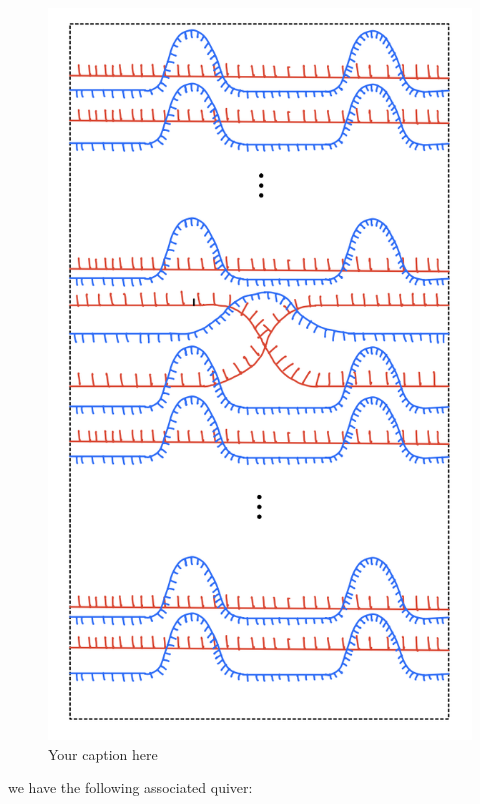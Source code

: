 \begin{figure}[H] 
    \centering
    \includegraphics[scale = 0.95]{diagrams/local_systems_on_as_diagrams/1-1.png} 
    \caption{Your caption here}
    \label{fig:your-label}
\end{figure}

we have the following associated quiver:

